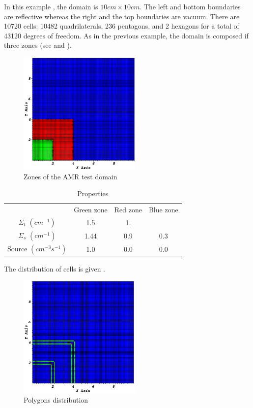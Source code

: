 In this example \cite{mip}, the domain is $10cm\times 10cm$. The left and bottom
boundaries are reflective whereas the right and the top boundaries are vacuum. 
There are 10720 cells: 10482 quadrilaterals, 236 pentagons,
and 2 hexagons for a total of 43120 degrees of freedom. 
As in the previous example, the domain is composed if three zones (see
 and ).
\begin{figure}[H]
  \centering
  \includegraphics[width=6cm]{zone_amr}
  \caption{Zones of the AMR test domain}
  \label{zone_amr}
\end{figure}
\begin{table}
  \begin{center}
    \caption{Properties}
    \begin{tabular}{|c|c|c|c|}
      \hline
      & Green zone & Red zone & Blue zone \\
    $\Sigma_t$ $(cm^{-1})$ & 1.5 & 1. \\
    $\Sigma_s$ $(cm^{-1})$ & 1.44 & 0.9 & 0.3 \\
  Source $(cm^{-3}s^{-1})$ & 1.0 & 0.0 & 0.0 \\
      \hline
    \end{tabular}
    \label{prop_amr}
  \end{center}
\end{table}
The distribution of cells is given .
\begin{figure}[H]
  \centering
  \includegraphics[width=6cm]{polygon_amr}
  \caption{Polygons distribution}
  \label{fig_pol_dist}
\end{figure}
